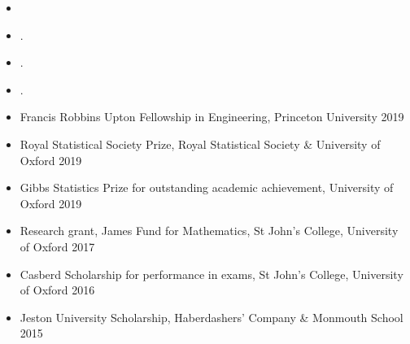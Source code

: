 \documentclass[
  date,
  number,
]{wgu-cv}
\begin{document}
\begin{itemize}
\item {}
\end{itemize}




\begin{itemize}
  \item {}.
  \item {}.
\end{itemize}


\begin{itemize}
  \item {}.
\end{itemize}


\pagebreak

\begin{itemize}
  \item Francis Robbins Upton Fellowship in Engineering,
    Princeton University
    \hfill 2019%
  \item Royal Statistical Society Prize,
    Royal Statistical Society \& University of Oxford
    \hfill 2019%
  \item Gibbs Statistics Prize for outstanding academic achievement,
    University of Oxford
    \hfill 2019%
	\item Research grant, James Fund for Mathematics,
    St John's College, University of Oxford
    \hfill 2017%
	\item Casberd Scholarship for performance in exams,
    St John's College, University of Oxford
    \hfill 2016%
  \item Jeston University Scholarship,
    Haberdashers' Company \& Monmouth School
    \hfill 2015%
\end{itemize}



\end{document}
